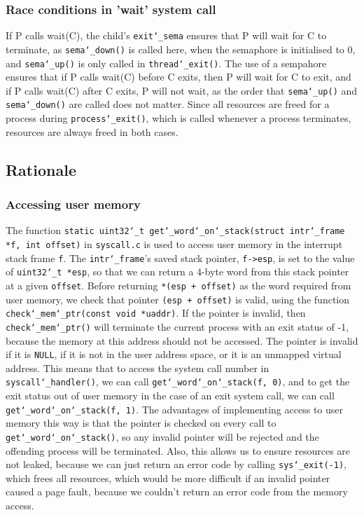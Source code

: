 \documentclass{article}
\renewcommand{\_}{\char`_}
\begin{document}
\subsubsection{Race conditions in 'wait' system call}

If P calls wait(C), the child's \texttt{exit\_sema} ensures that P will wait for C to terminate, as \texttt{sema\_down()} is called here, when the semaphore is initialised to 0, and \texttt{sema\_up()} is only called in \texttt{thread\_exit()}. The use of a sempahore ensures that if P calls wait(C) before C exits, then P will wait for C to exit, and if P calls wait(C) after C exits, P will not wait, as the order that \texttt{sema\_up()} and \texttt{sema\_down()} are called does not matter. Since all resources are freed for a process during \texttt{process\_exit()}, which is called whenever a process terminates, resources are always freed in both cases.

\subsection{Rationale}

\subsubsection{Accessing user memory}

The function \texttt{static uint32\_t get\_word\_on\_stack(struct intr\_frame *f, int offset)} in \texttt{syscall.c} is used to access user memory in the interrupt stack frame \texttt{f}. The \texttt{intr\_frame}'s saved stack pointer, \texttt{f->esp}, is set to the value of \texttt{uint32\_t *esp}, so that we can return a 4-byte word from this stack pointer at a given \texttt{offset}. Before returning \texttt{*(esp + offset)} as the word required from user memory, we check that pointer \texttt{(esp + offset)} is valid, using the function \texttt{check\_mem\_ptr(const void *uaddr)}. If the pointer is invalid, then \texttt{check\_mem\_ptr()} will terminate the current process with an exit status of -1, because the memory at this address should not be accessed. The pointer is invalid if it is \texttt{NULL}, if it is not in the user address space, or it is an unmapped virtual address. This means that to access the system call number in \texttt{syscall\_handler()}, we can call \texttt{get\_word\_on\_stack(f, 0)}, and to get the exit status out of user memory in the case of an exit system call, we can call \texttt{get\_word\_on\_stack(f, 1)}. The advantages of implementing access to user memory this way is that the pointer is checked on every call to \texttt{get\_word\_on\_stack()}, so any invalid pointer will be rejected and the offending process will be terminated. Also, this allows us to ensure resources are not leaked, because we can just return an error code by calling \texttt{sys\_exit(-1)}, which frees all resources, which would be more difficult if an invalid pointer caused a page fault, because we couldn't return an error code from the memory access.
\end{document}
